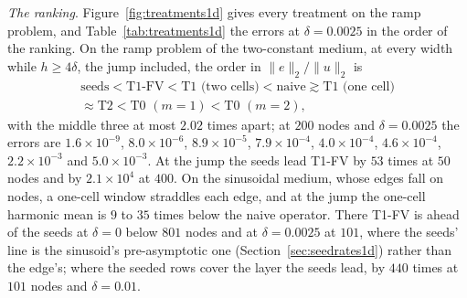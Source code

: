 \documentclass[11pt]{amsart}
\theoremstyle{definition}
\theoremstyle{remark}
\newcommand{\para}[1]{\par\smallskip\noindent\textit{#1}.\enspace}
\newcommand{\sci}[2]{#1 \times 10^{#2}}
\begin{document}
\para{The ranking}
Figure~\ref{fig:treatments1d} gives every treatment on the ramp problem, and
Table~\ref{tab:treatments1d} the errors at $\delta = 0.0025$ in the order of
the ranking. On the ramp problem of the two-constant medium, at every width
while $h \ge 4\delta$, the jump included, the order in
$\|e\|_2 / \|u\|_2$ is
\begin{multline*}
  \text{seeds} < \text{T1-FV} < \text{T1 (two cells)} < \text{naive}
  \gtrsim \text{T1 (one cell)} \\
  \approx \text{T2} < \text{T0 } (m = 1) < \text{T0 } (m = 2),
\end{multline*}
with the middle three at most $2.02$ times apart; at $200$
nodes and $\delta = 0.0025$ the errors are $\sci{1.6}{-9}$,
$\sci{8.0}{-6}$, $\sci{8.9}{-5}$, $\sci{7.9}{-4}$, $\sci{4.0}{-4}$,
$\sci{4.6}{-4}$, $\sci{2.2}{-3}$ and $\sci{5.0}{-3}$. At the jump the seeds
lead T1-FV by $53$ times at $50$ nodes and by $\sci{2.1}{4}$ at $400$. On
the sinusoidal medium, whose edges fall on nodes, a one-cell window
straddles each edge, and at the jump the one-cell harmonic mean is $9$ to
$35$ times below the naive operator. There T1-FV is ahead of the seeds at
$\delta = 0$ below $801$ nodes and at $\delta = 0.0025$ at $101$, where the
seeds' line is the sinusoid's pre-asymptotic one
(Section~\ref{sec:seedrates1d}) rather than the edge's; where the seeded rows
cover the layer the seeds lead, by $440$ times at $101$ nodes and
$\delta = 0.01$.
\end{document}
